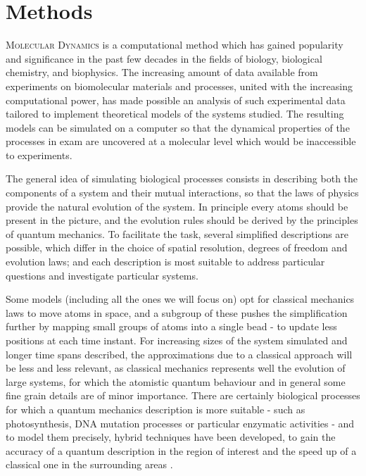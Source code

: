 \chapter{Methods} \label{chapter:MD}

\lettrine{M}{olecular Dynamics} is a computational method which has gained popularity and significance in the past few decades in the fields of biology, biological chemistry, and biophysics.
%
The increasing amount of data available from experiments on biomolecular materials and processes, united with the increasing computational power, has made possible an analysis of such experimental data tailored to implement theoretical models of the systems studied.
%
The resulting models can be simulated on a computer so that the dynamical properties of the processes in exam are uncovered at a molecular level which would be inaccessible to experiments.

The general idea of simulating biological processes consists in describing both the components of a system and their mutual interactions, so that the laws of physics provide the natural evolution of the system. In principle every atoms should be present in the picture, and the evolution rules should be derived by the principles of quantum mechanics.
%
To facilitate the task, several simplified descriptions are possible, which differ in the choice of spatial resolution, degrees of freedom and evolution laws; and each description is most suitable to address particular questions and investigate particular systems.

Some models (including all the ones we will focus on) opt for classical mechanics laws to move atoms in space, and a subgroup of these pushes the simplification further by mapping small groups of atoms into a single bead - to update less positions at each time instant.
%
For increasing sizes of the system simulated and longer time spans described, the approximations due to a classical approach will be less and less relevant, as classical mechanics represents well the evolution of large systems, for which the atomistic quantum behaviour and in general some fine grain details are of minor importance.
%
There are certainly biological processes for which a quantum mechanics description is more suitable - such as photosynthesis, DNA mutation processes or particular enzymatic activities - and to model them precisely, hybrid techniques have been developed, to gain the accuracy of a quantum description in the region of interest and the speed up of a classical one in the surrounding areas \cite{??}.

